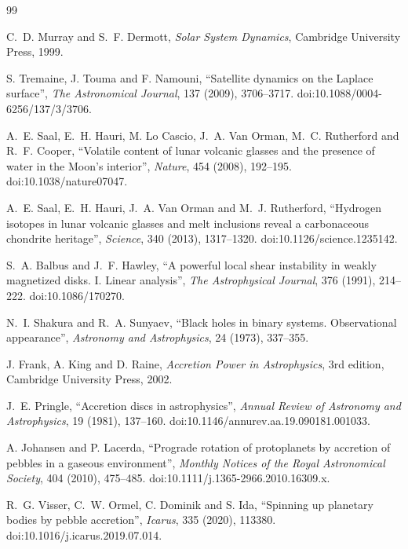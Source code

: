\documentclass[11pt,a4paper,openany]{report}
\begin{document}
\clearpage
{}
{}
\begin{thebibliography}{99}
\small

 C.~D. Murray and S.~F. Dermott, \emph{Solar System Dynamics},
Cambridge University Press, 1999.

 S. Tremaine, J. Touma and F. Namouni, ``Satellite dynamics on the
Laplace surface'', \emph{The Astronomical Journal}, 137 (2009), 3706--3717.
doi:10.1088/0004-6256/137/3/3706.

 A.~E. Saal, E.~H. Hauri, M. Lo Cascio, J.~A. Van Orman, M.~C. Rutherford and
R.~F. Cooper, ``Volatile content of lunar volcanic glasses and the presence of water in the Moon's
interior'', \emph{Nature}, 454 (2008), 192--195. doi:10.1038/nature07047.

 A.~E. Saal, E.~H. Hauri, J.~A. Van Orman and M.~J. Rutherford, ``Hydrogen
isotopes in lunar volcanic glasses and melt inclusions reveal a carbonaceous chondrite heritage'',
\emph{Science}, 340 (2013), 1317--1320. doi:10.1126/science.1235142.

 S.~A. Balbus and J.~F. Hawley, ``A powerful local shear instability in
weakly magnetized disks. I. Linear analysis'', \emph{The Astrophysical Journal}, 376 (1991),
214--222. doi:10.1086/170270.

 N.~I. Shakura and R.~A. Sunyaev, ``Black holes in binary systems.
Observational appearance'', \emph{Astronomy and Astrophysics}, 24 (1973), 337--355.

 J. Frank, A. King and D. Raine, \emph{Accretion Power in Astrophysics},
3rd edition, Cambridge University Press, 2002.

 J.~E. Pringle, ``Accretion discs in astrophysics'', \emph{Annual Review of
Astronomy and Astrophysics}, 19 (1981), 137--160. doi:10.1146/annurev.aa.19.090181.001033.

 A. Johansen and P. Lacerda, ``Prograde rotation of protoplanets by
accretion of pebbles in a gaseous environment'', \emph{Monthly Notices of the Royal Astronomical
Society}, 404 (2010), 475--485. doi:10.1111/j.1365-2966.2010.16309.x.

 R.~G. Visser, C.~W. Ormel, C. Dominik and S. Ida, ``Spinning up planetary
bodies by pebble accretion'', \emph{Icarus}, 335 (2020), 113380. doi:10.1016/j.icarus.2019.07.014.


\end{thebibliography}
\end{document}
